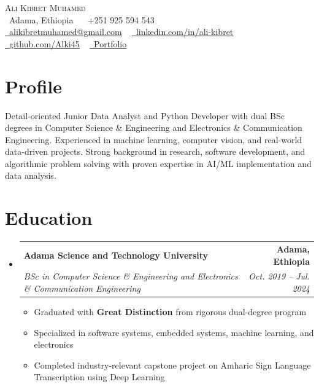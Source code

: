 \documentclass[letterpaper,11pt]{article}
\makeatletter
\newcommand{\resumeItem}[1]{
  \item\small{
    {#1 \vspace{-2pt}}
  }
}
\newcommand{\resumeSubheading}[4]{
  \vspace{-2pt}\item
    \begin{tabular*}{1.0\textwidth}[t]{l@{\extracolsep{\fill}}r}
      \textbf{#1} & \textbf{\small #2} \\
      \textit{\small#3} & \textit{\small #4} \\
    \end{tabular*}\vspace{-7pt}
}
\newcommand{\resumeSubHeadingListStart}{\begin{itemize}[leftmargin=0.0in, label={}]}
\newcommand{\resumeSubHeadingListEnd}{\end{itemize}}
\newcommand{\resumeItemListStart}{\begin{itemize}}
\newcommand{\resumeItemListEnd}{\end{itemize}\vspace{-5pt}}
\makeatother
\begin{document}
\begin{center}
    {\Huge \scshape Ali Kibret Muhamed} \\ \vspace{1pt}
    \small \raisebox{-0.1\height}\faMapMarker\ Adama, Ethiopia ~
    \raisebox{-0.1\height}\faPhone\ +251 925 594 543 \\ \vspace{3pt}
    \href{mailto:alikibretmuhamed@gmail.com}{\raisebox{-0.2\height}\faEnvelope\  \underline{alikibretmuhamed@gmail.com}} ~ 
    \href{https://linkedin.com/in/ali-kibret}{\raisebox{-0.2\height}\faLinkedin\ \underline{linkedin.com/in/ali-kibret}}  ~
    \href{https://github.com/Alki45}{\raisebox{-0.2\height}\faGithub\ \underline{github.com/Alki45}} ~
    \href{https://ali-kibret-git-main-alki45s-projects.vercel.app/}{\raisebox{-0.2\height}\faGlobe\ \underline{Portfolio}}
    \vspace{-8pt}
\end{center}

\section{Profile}
  Detail-oriented Junior Data Analyst and Python Developer with dual BSc degrees in Computer Science \& Engineering and Electronics \& Communication Engineering. Experienced in machine learning, computer vision, and real-world data-driven projects. Strong background in research, software development, and algorithmic problem solving with proven expertise in AI/ML implementation and data analysis.

\section{Education}
  \resumeSubHeadingListStart
    \resumeSubheading
      {Adama Science and Technology University}{Adama, Ethiopia}
      {BSc in Computer Science \& Engineering and Electronics \& Communication Engineering}{Oct. 2019 -- Jul. 2024}
      \resumeItemListStart
        \resumeItem{Graduated with \textbf{Great Distinction} from rigorous dual-degree program}
        \resumeItem{Specialized in software systems, embedded systems, machine learning, and electronics}
        \resumeItem{Completed industry-relevant capstone project on Amharic Sign Language Transcription using Deep Learning}
      \resumeItemListEnd
  \resumeSubHeadingListEnd
\end{document}
